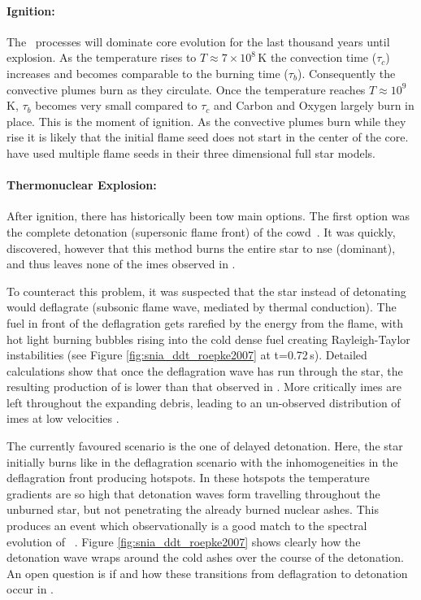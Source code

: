 \paragraph{Ignition:} The \urca\ processes will dominate core evolution for the last thousand years until explosion. As the temperature rises to $T\approx7 \times 10^8$\,K \citep{2000ARA&A..38..191H} the convection time ($\tau_c$) increases and becomes comparable to the burning time ($\tau_b$). Consequently the convective plumes burn as they circulate. Once the temperature reaches $T\approx 10^9$\,K, $\tau_b$ becomes very small compared to $\tau_c$ and Carbon and Oxygen largely burn in place. This is the moment of ignition. As the convective plumes burn while they rise it is likely that the initial flame seed does not start in the center of the core. \cite{2005A&A...431..635R} have used multiple flame seeds in their three dimensional full star models.

\paragraph{Thermonuclear Explosion:} After ignition, there has historically been tow main options. The first option was the complete detonation (supersonic flame front) of the \gls{cowd}\ \citep{1969Ap&SS...5..180A}. It was quickly, discovered, however that this method burns the entire star to \gls{nse} (\Ni dominant),  and thus leaves none of the \glspl{ime} observed in \sneia. 

To counteract this problem, it was suspected that the star instead of detonating would deflagrate (subsonic flame wave, mediated by thermal conduction). The fuel in front of the deflagration gets rarefied by the energy from the flame, with hot light burning bubbles rising into the cold dense fuel creating Rayleigh-Taylor instabilities (see Figure \ref{fig:snia_ddt_roepke2007} at t=0.72\,s). 
Detailed calculations show that once the deflagration wave has run through the star, the resulting production of \Ni[56] is lower than that observed in \sneia. More critically \glspl{ime} are left throughout the expanding debris, leading to an un-observed distribution of \glspl{ime} at low velocities \citep{2007Sci...315..825M}.

The currently favoured scenario is the one of delayed detonation. Here, the star initially burns like in the deflagration scenario with the inhomogeneities in the deflagration front producing hotspots. In these hotspots the temperature gradients are so high that detonation waves form travelling throughout the unburned star, but not penetrating the already burned nuclear ashes. This produces an event which observationally is a good match to the spectral evolution of \sneia\ \citep{2009Natur.460..869K}. Figure \ref{fig:snia_ddt_roepke2007} shows clearly how the detonation wave wraps around the cold ashes over the course of the detonation. An open question is if and how these transitions from deflagration to detonation occur in \sneia.


